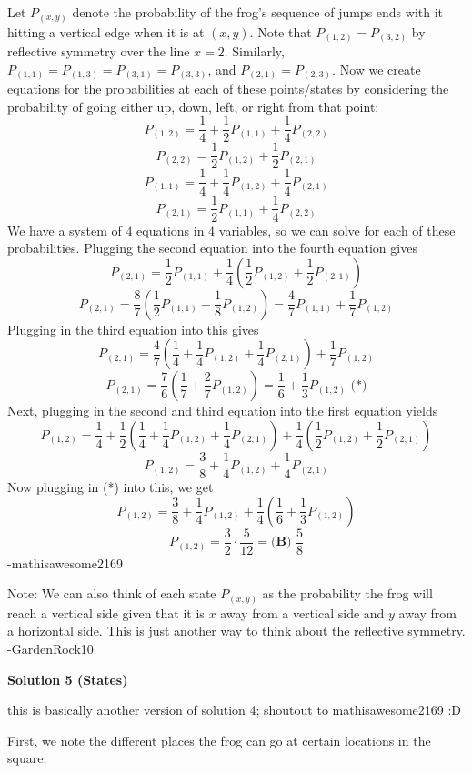 \begin{enumerate}
Let $P_{(x,y)}$ denote the probability of the frog's sequence of jumps ends with it hitting a vertical edge when it is at $(x,y)$. Note that $P_{(1,2)}=P_{(3,2)}$ by reflective symmetry over the line $x=2$. Similarly, $P_{(1,1)}=P_{(1,3)}=P_{(3,1)}=P_{(3,3)}$, and $P_{(2,1)}=P_{(2,3)}$. Now we create equations for the probabilities at each of these points/states by considering the probability of going either up, down, left, or right from that point: 
 \[P_{(1,2)}=\frac{1}{4}+\frac{1}{2}P_{(1,1)}+\frac{1}{4}P_{(2,2)}\]
 \[P_{(2,2)}=\frac{1}{2}P_{(1,2)}+\frac{1}{2}P_{(2,1)}\]
 \[P_{(1,1)}=\frac{1}{4}+\frac{1}{4}P_{(1,2)}+\frac{1}{4}P_{(2,1)}\]
 \[P_{(2,1)}=\frac{1}{2}P_{(1,1)}+\frac{1}{4}P_{(2,2)}\]We have a system of $4$ equations in $4$ variables, so we can solve for each of these probabilities. Plugging the second equation into the fourth equation gives 
 \[P_{(2,1)}=\frac{1}{2}P_{(1,1)}+\frac{1}{4}\left(\frac{1}{2}P_{(1,2)}+\frac{1}{2}P_{(2,1)}\right)\]
 \[P_{(2,1)}=\frac{8}{7}\left(\frac{1}{2}P_{(1,1)}+\frac{1}{8}P_{(1,2)}\right)=\frac{4}{7}P_{(1,1)}+\frac{1}{7}P_{(1,2)}\]Plugging in the third equation into this gives 
 \[P_{(2,1)}=\frac{4}{7}\left(\frac{1}{4}+\frac{1}{4}P_{(1,2)}+\frac{1}{4}P_{(2,1)}\right)+\frac{1}{7}P_{(1,2)}\]
 \[P_{(2,1)}=\frac{7}{6}\left(\frac{1}{7}+\frac{2}{7}P_{(1,2)}\right)=\frac{1}{6}+\frac{1}{3}P_{(1,2)}\text{    (*)}\]Next, plugging in the second and third equation into the first equation yields 
 \[P_{(1,2)}=\frac{1}{4}+\frac{1}{2}\left(\frac{1}{4}+\frac{1}{4}P_{(1,2)}+\frac{1}{4}P_{(2,1)}\right)+\frac{1}{4}\left(\frac{1}{2}P_{(1,2)}+\frac{1}{2}P_{(2,1)}\right)\]
 \[P_{(1,2)}=\frac{3}{8}+\frac{1}{4}P_{(1,2)}+\frac{1}{4}P_{(2,1)}\]Now plugging in (*) into this, we get 
 \[P_{(1,2)}=\frac{3}{8}+\frac{1}{4}P_{(1,2)}+\frac{1}{4}\left(\frac{1}{6}+\frac{1}{3}P_{(1,2)}\right)\]
 \[P_{(1,2)}=\frac{3}{2}\cdot\frac{5}{12}=\boxed{\textbf{(B) }\frac{5}{8}}\]-mathisawesome2169

 Note: We can also think of each state $P_{(x,y)}$ as the probability the frog will reach a vertical side given that it is $x$ away from a vertical side and $y$ away from a horizontal side. This is just another way to think about the reflective symmetry. -GardenRock10

 



\textbf{Solution 5 (States)}

this is basically another version of solution 4; shoutout to mathisawesome2169 :D

 First, we note the different places the frog can go at certain locations in the square:


\end{enumerate}
